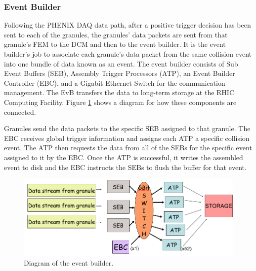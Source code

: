 
\subsubsection{Event Builder}
Following the PHENIX DAQ data path, after a positive trigger decision has been sent to each of the granules, the granules' data packets are sent from that granule's FEM to the DCM and then to the event builder. It is the event builder's job to associate each granule's data packet from the same collision event into one bundle of data known as an event. The event builder consists of Sub Event Buffers (SEB), Assembly Trigger Processors (ATP), an Event Builder Controller (EBC), and a Gigabit Ethernet Switch for the communication management. The EvB transfers the data to long-term storage at the RHIC Computing Facility. Figure \ref{fig:evb_diag} shows a diagram for how these components are connected.

Granules send the data packets to the specific SEB assigned to that granule. The EBC receives global trigger information and assigns each ATP a specific collision event. The ATP then requests the data from all of the SEBs for the specific event assigned to it by the EBC. Once the ATP is successful, it writes the assembled event to disk and the EBC instructs the SEBs to flush the buffer for that event.

\begin{figure}[h!]
\begin{center}
\includegraphics[width=0.73\linewidth]{figs/evb_diagram.png}
\caption{Diagram of the event builder. }\label{fig:evb_diag}
\end{center}
\end{figure}

